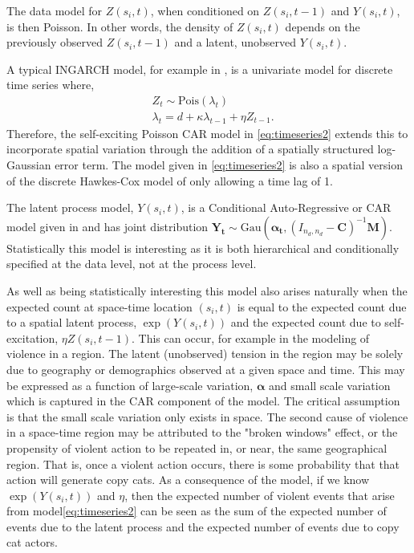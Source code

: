 \documentclass[11pt]{isuthesis}
\begin{document}
	The data model for $Z(s_i,t)$, when conditioned on $Z(s_i,t-1)$ and $Y(s_i,t)$, is then Poisson.  In other words, the density of $Z(s_i,t)$ depends on the previously observed $Z(s_i,t-1)$ and a latent, unobserved $Y(s_i,t)$.
	
	A typical INGARCH model, for example in \cite{davis2016handbook}, is a univariate model for discrete time series where,
	\begin{align}
	& Z_t \sim \mbox{Pois}(\lambda_t) \label{eq:INGARH} \\
	&\lambda_t= d+\kappa \lambda_{t-1}+\eta Z_{t-1}.
	\end{align}
	Therefore, the self-exciting Poisson CAR model in \eqref{eq:timeseries2} extends this to incorporate spatial variation through the addition of a spatially structured log-Gaussian error term.  The model given in \eqref{eq:timeseries2} is also a spatial version of the discrete Hawkes-Cox model of \cite{mohler2013modeling} only allowing a time lag of 1.
	
	The latent process model, $Y(s_i,t)$, is a Conditional Auto-Regressive or CAR model given in \cite{cressie2015statistics} and has joint distribution $\boldsymbol{Y_t}\sim \mbox{Gau}(\boldsymbol{\alpha_t},(I_{{n_d},{n_d}}-\boldsymbol{C})^{-1}\boldsymbol{M})$. Statistically this model is interesting as it is both hierarchical and conditionally specified at the data level, not at the process level.  
	
	As well as being statistically interesting this model also arises naturally when the expected count at space-time location $(s_i,t)$ is equal to the expected count due to a spatial latent process, $\exp(Y(s_i,t))$ and the expected count due to self-excitation, $\eta Z(s_i,t-1)$. This can occur, for example in the modeling of violence in a region.  The latent (unobserved) tension in the region may be solely due to geography or demographics observed at a given space and time.  This may be expressed as a function of large-scale variation, $\boldsymbol{\alpha}$ and small scale variation which is captured in the CAR component of the model.  The critical assumption is that the small scale variation only exists in space.  The second cause of violence in a space-time region may be attributed to the "broken windows" effect, or the propensity of violent action to be repeated in, or near, the same geographical region.  That is, once a violent action occurs, there is some probability that that action will generate copy cats.  As a consequence of the model, if we know $\exp(Y(s_i,t))$ and $\eta$, then the expected number of violent events that arise from model\eqref{eq:timeseries2} can be seen as the sum of the expected number of events due to the latent process and the expected number of events due to copy cat actors.
	
\end{document}
